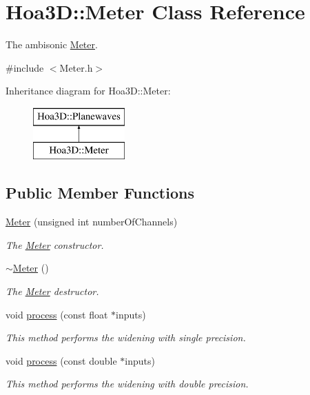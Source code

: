 \hypertarget{class_hoa3_d_1_1_meter}{\section{Hoa3\-D\-:\-:Meter Class Reference}
\label{class_hoa3_d_1_1_meter}
}


The ambisonic \hyperlink{class_hoa3_d_1_1_meter}{Meter}.  




{\ttfamily \#include $<$Meter.\-h$>$}

Inheritance diagram for Hoa3\-D\-:\-:Meter\-:\begin{figure}[H]
\begin{center}
\leavevmode
\includegraphics[height=2.000000cm]{class_hoa3_d_1_1_meter}
\end{center}
\end{figure}
\subsection*{Public Member Functions}
\begin{DoxyCompactItemize}
\item 
\hyperlink{class_hoa3_d_1_1_meter_a8dbe4a3655161c329540557cfed8c52a}{Meter} (unsigned int number\-Of\-Channels)
\begin{DoxyCompactList}\small\item\em The \hyperlink{class_hoa3_d_1_1_meter}{Meter} constructor. \end{DoxyCompactList}\item 
\hyperlink{class_hoa3_d_1_1_meter_a2f4d18e0007e96c1cd60e2f17d9575cc}{$\sim$\-Meter} ()
\begin{DoxyCompactList}\small\item\em The \hyperlink{class_hoa3_d_1_1_meter}{Meter} destructor. \end{DoxyCompactList}\item 
void \hyperlink{class_hoa3_d_1_1_meter_a85c538e8cf9791674a9ac6e602463dd0}{process} (const float $\ast$inputs)
\begin{DoxyCompactList}\small\item\em This method performs the widening with single precision. \end{DoxyCompactList}\item 
void \hyperlink{class_hoa3_d_1_1_meter_a273685843e1059b74b6d386dfb19c53b}{process} (const double $\ast$inputs)
\begin{DoxyCompactList}\small\item\em This method performs the widening with double precision. \end{DoxyCompactList}\end{DoxyCompactItemize}



